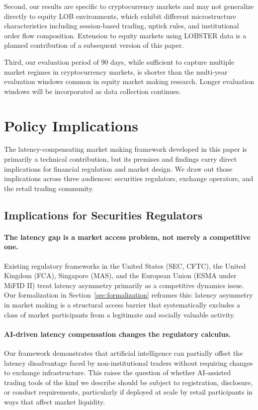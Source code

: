 \documentclass[12pt]{article}
\begin{document}
Second, our results are specific to cryptocurrency markets and may not generalize directly to equity LOB environments, which exhibit different microstructure characteristics including session-based trading, uptick rules, and institutional order flow composition. Extension to equity markets using LOBSTER data is a planned contribution of a subsequent version of this paper.

Third, our evaluation period of 90 days, while sufficient to capture multiple market regimes in cryptocurrency markets, is shorter than the multi-year evaluation windows common in equity market making research. Longer evaluation windows will be incorporated as data collection continues.

\section{Policy Implications}
\label{sec:policy}

The latency-compensating market making framework developed in this paper is primarily a technical contribution, but its premises and findings carry direct implications for financial regulation and market design. We draw out those implications across three audiences: securities regulators, exchange operators, and the retail trading community.

\subsection{Implications for Securities Regulators}

\paragraph{The latency gap is a market access problem, not merely a competitive one.} Existing regulatory frameworks in the United States (SEC, CFTC), the United Kingdom (FCA), Singapore (MAS), and the European Union (ESMA under MiFID II) treat latency asymmetry primarily as a competitive dynamics issue. Our formalization in Section~\ref{sec:formalization} reframes this: latency asymmetry in market making is a structural access barrier that systematically excludes a class of market participants from a legitimate and socially valuable activity.

\paragraph{AI-driven latency compensation changes the regulatory calculus.} Our framework demonstrates that artificial intelligence can partially offset the latency disadvantage faced by non-institutional traders without requiring changes to exchange infrastructure. This raises the question of whether AI-assisted trading tools of the kind we describe should be subject to registration, disclosure, or conduct requirements, particularly if deployed at scale by retail participants in ways that affect market liquidity.
\end{document}
